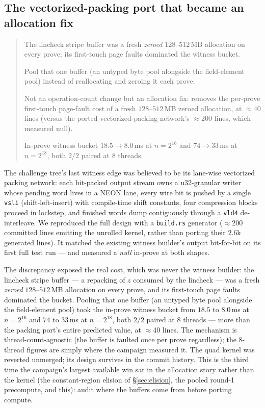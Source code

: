 \documentclass[11pt]{article}
\newcommand{\code}[1]{\texttt{#1}}
\newenvironment{optsummary}{%
  \begin{quote}\small
  \begin{description}
  \setlength{\itemsep}{1pt}\setlength{\parsep}{0pt}\setlength{\topsep}{2pt}
}{%
  \end{description}
  \end{quote}
}
\begin{document}
\subsection{The vectorized-packing port that became an allocation fix}
\label{sec:zpool}

\begin{optsummary}
\item[Baseline:] The lincheck stripe buffer was a fresh \emph{zeroed} $128$--$512$\,MB allocation on every prove; its first-touch page faults dominated the witness bucket.
\item[Improvement:] Pool that one buffer (an untyped byte pool alongside the field-element pool) instead of reallocating and zeroing it each prove.
\item[Mechanism:] Not an operation-count change but an allocation fix: removes the per-prove first-touch page-fault cost of a fresh $128$--$512$\,MB zeroed allocation, at $\approx$40 lines (versus the ported vectorized-packing network's $\approx$200 lines, which measured null).
\item[Result:] In-prove witness bucket $18.5\to8.0\,$ms at $n=2^{16}$ and $74\to33\,$ms at $n=2^{18}$, both $2/2$ paired at 8 threads.
\end{optsummary}

The challenge tree's last witness edge was believed to be its lane-wise
vectorized packing network: each bit-packed output stream owns a
u32-granular writer whose pending word lives in a NEON lane, every wire
bit is pushed by a single \code{vsli} (shift-left-insert) with
compile-time shift constants, four compression blocks proceed in
lockstep, and finished words dump contiguously through a
\code{vld4} de-interleave. We reproduced the full design with a
\code{build.rs} generator ($\approx$200 committed lines emitting the
unrolled kernel, rather than porting their $2.6$k generated lines). It
matched the existing witness builder's output bit-for-bit on its first
full test run --- and measured a \emph{null} in-prove at both shapes.

The discrepancy exposed the real cost, which was never the witness builder: the
lincheck stripe buffer --- a repacking of $z$ consumed by the lincheck
--- was a fresh \emph{zeroed} $128$--$512$\,MB allocation on every
prove, and its first-touch page faults dominated the bucket. Pooling
that one buffer (an untyped byte pool alongside the field-element pool)
took the in-prove witness bucket from $18.5$ to $8.0$\,ms at $n=2^{16}$
and $74$ to $33$\,ms at $n=2^{18}$, both $2/2$ paired at 8 threads ---
more than the packing port's entire predicted value, at $\approx$40
lines. The mechanism is thread-count-agnostic (the buffer is faulted
once per prove regardless); the 8-thread figures are simply where the
campaign measured it. The quad kernel was reverted unmerged; its design
survives in the commit history. This is the third time the campaign's
largest available win sat in the allocation story rather than the
kernel (the constant-region elision of \S\ref{sec:elision}, the pooled
round-1 precompute, and this): audit where the buffers come from before
porting compute.
\end{document}
